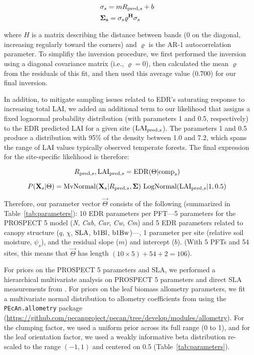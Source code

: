 \begin{align}
  & \relax{\sigma_{s}} = m R_{\mathrm{pred}, s} + b \\
  & \mathbf{\Sigma_{s}} = \relax{\sigma_{s}} \varrho^{\mathbf{H}} \relax{\sigma_{s}}
\end{align}

where $H$ is a matrix describing the distance between bands (0 on the diagonal, increasing regularly toward the corners) and $\varrho$ is the AR-1 autocorrelation parameter.
To simplifiy the inversion procedure, we first performed the inversion using a diagonal covariance matrix (i.e., $\varrho = 0$), then calculated the mean $\varrho$ from the residuals of this fit, and then used this average value (0.700) for our final inversion.

In addition, to mitigate sampling issues related to EDR's saturating response to increasing total LAI, we added an additional term to our likelihood that assigns a fixed lognormal probability distribution (with parameters 1 and 0.5, respectively) to the EDR predicted LAI for a given site ($\mathrm{LAI}_{\mathrm{pred}, s}$).
The parameters 1 and 0.5 produce a distribution with 95\% of the density between 1.0 and 7.2, which spans the range of LAI values typically observed temperate forests.
The final expression for the site-specific likelihood is therefore:

\begin{equation}
  R_{\mathrm{pred}, s}, \mathrm{LAI}_{\mathrm{pred}, s} = \mathrm{EDR}(\relax{\Theta} | \mathrm{comp}_{s})
\end{equation}

\begin{equation}
  P(\mathbf{X}_{s} | \relax{\Theta}) =
  \mathrm{MvNormal}(\mathbf{X}_{s} | R_{\mathrm{pred}, s}, \mathbf{\Sigma}) ~
  \mathrm{LogNormal}(\mathrm{LAI}_{\mathrm{pred}, s} | 1, 0.5)
\end{equation}

Therefore, our parameter vector $\vec{\Theta}$ consists of the following (summarized in Table~\ref{tab:parameters}):
10 EDR parameters per PFT---5 parameters for the PROSPECT 5 model (\emph{N}, \emph{Cab}, \emph{Car}, \emph{Cw}, \emph{Cm}) and 5 EDR parameters related to canopy structure ($q$, $\chi$, $\mathrm{SLA}$, $\mathrm{b1Bl}$, $\mathrm{b1Bw}$)---,
1 parameter per site (relative soil moisture, $\psi_{s}$),
and the residual slope ($m$) and intercept ($b$).
(With 5 PFTs and 54 sites, this means that $\vec{\Theta}$ has length $(10 \times 5) + 54 + 2 = 106$).

For priors on the PROSPECT 5 parameters and SLA, we performed a hierarchical multivariate analysis \citep{shiklomanov2020does} on PROSPECT 5 parameters and direct SLA measurements from \citep[][Chapter 3]{shiklomanov_dissertation}.
For priors on the leaf biomass allometry parameters, we fit a multivariate normal distribution to allometry coefficients from \citet{jenkins2003nationalscale,jenkins2004comprehensive} using the \texttt{PEcAn.allometry} package (\url{https://github.com/pecanproject/pecan/tree/develop/modules/allometry}).
For the clumping factor, we used a uniform prior across its full range (0 to 1), and for the leaf orientation factor, we used a weakly informative beta distribution re-scaled to the range $(-1, 1)$ and centered on 0.5 (Table~\ref{tab:parameters}).

